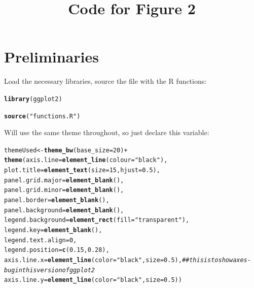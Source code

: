 \documentclass{article}\usepackage[]{graphicx}\usepackage[]{color}
\title{Code for Figure 2}
\makeatletter
\newcommand{\hlnum}[1]{\textcolor[rgb]{0.686,0.059,0.569}{#1}}%
\newcommand{\hlstr}[1]{\textcolor[rgb]{0.192,0.494,0.8}{#1}}%
\newcommand{\hlcom}[1]{\textcolor[rgb]{0.678,0.584,0.686}{\textit{#1}}}%
\newcommand{\hlopt}[1]{\textcolor[rgb]{0,0,0}{#1}}%
\newcommand{\hlstd}[1]{\textcolor[rgb]{0.345,0.345,0.345}{#1}}%
\newcommand{\hlkwb}[1]{\textcolor[rgb]{0.69,0.353,0.396}{#1}}%
\newcommand{\hlkwc}[1]{\textcolor[rgb]{0.333,0.667,0.333}{#1}}%
\newcommand{\hlkwd}[1]{\textcolor[rgb]{0.737,0.353,0.396}{\textbf{#1}}}%
\newenvironment{kframe}{%
 \def\at@end@of@kframe{}%
 \ifinner\ifhmode%
  \def\at@end@of@kframe{\end{minipage}}%
  \begin{minipage}{\columnwidth}%
 \fi\fi%
 \def\FrameCommand##1{\hskip\@totalleftmargin \hskip-\fboxsep
 \colorbox{shadecolor}{##1}\hskip-\fboxsep
     \hskip-\linewidth \hskip-\@totalleftmargin \hskip\columnwidth}%
 \MakeFramed {\advance\hsize-\width
   \@totalleftmargin\z@ \linewidth\hsize
   \@setminipage}}%
 {\par\unskip\endMakeFramed%
 \at@end@of@kframe}
\newenvironment{knitrout}{}{} %
\makeatother
\begin{document}
\maketitle



\section{Preliminaries}

Load the necessary libraries, source the file with the R functions:
\begin{knitrout}
\color{fgcolor}\begin{kframe}
\begin{alltt}
\hlkwd{library}\hlstd{(ggplot2)}

\hlkwd{source}\hlstd{(}\hlstr{"functions.R"}\hlstd{)}
\end{alltt}
\end{kframe}
\end{knitrout}

Will use the same theme throughout, so just declare this variable:
\begin{knitrout}
\color{fgcolor}\begin{kframe}
\begin{alltt}
\hlstd{themeUsed} \hlkwb{<-} \hlkwd{theme_bw}\hlstd{(}\hlkwc{base_size} \hlstd{=} \hlnum{20}\hlstd{)} \hlopt{+}
  \hlkwd{theme}\hlstd{(}\hlkwc{axis.line} \hlstd{=} \hlkwd{element_line}\hlstd{(}\hlkwc{colour} \hlstd{=} \hlstr{"black"}\hlstd{),}
        \hlkwc{plot.title} \hlstd{=} \hlkwd{element_text}\hlstd{(}\hlkwc{size} \hlstd{=} \hlnum{15}\hlstd{,} \hlkwc{hjust}\hlstd{=}\hlnum{0.5}\hlstd{),}
        \hlkwc{panel.grid.major} \hlstd{=} \hlkwd{element_blank}\hlstd{(),}
        \hlkwc{panel.grid.minor} \hlstd{=} \hlkwd{element_blank}\hlstd{(),}
        \hlkwc{panel.border} \hlstd{=} \hlkwd{element_blank}\hlstd{(),}
        \hlkwc{panel.background} \hlstd{=} \hlkwd{element_blank}\hlstd{(),}
        \hlkwc{legend.background} \hlstd{=} \hlkwd{element_rect}\hlstd{(}\hlkwc{fill}\hlstd{=}\hlstr{"transparent"}\hlstd{),}
        \hlkwc{legend.key} \hlstd{=} \hlkwd{element_blank}\hlstd{(),}
        \hlkwc{legend.text.align} \hlstd{=} \hlnum{0}\hlstd{,}
        \hlkwc{legend.position} \hlstd{=} \hlkwd{c}\hlstd{(}\hlnum{0.15}\hlstd{,}\hlnum{0.28}\hlstd{),}
        \hlkwc{axis.line.x} \hlstd{=} \hlkwd{element_line}\hlstd{(}\hlkwc{color}\hlstd{=}\hlstr{"black"}\hlstd{,} \hlkwc{size} \hlstd{=} \hlnum{0.5}\hlstd{),} \hlcom{##this is to show axes - bug in this version of ggplot2}
        \hlkwc{axis.line.y} \hlstd{=} \hlkwd{element_line}\hlstd{(}\hlkwc{color}\hlstd{=}\hlstr{"black"}\hlstd{,} \hlkwc{size} \hlstd{=} \hlnum{0.5}\hlstd{))}
\end{alltt}
\end{kframe}
\end{knitrout}
  
\end{document}
